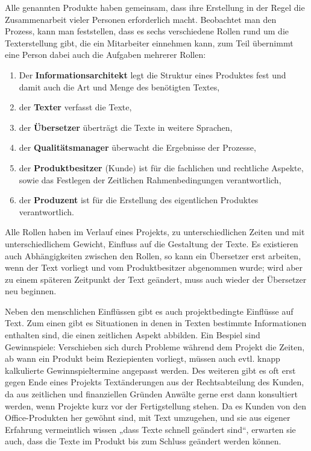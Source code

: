\documentclass[11pt,a4paper]{article}
\begin{document}
Alle genannten Produkte haben gemeinsam, dass ihre Erstellung in der Regel die Zusammenarbeit vieler Personen erforderlich macht. Beobachtet man den Prozess, kann man feststellen, dass es sechs verschiedene Rollen rund um die Texterstellung gibt, die ein Mitarbeiter einnehmen kann, zum Teil übernimmt eine Person dabei auch die Aufgaben mehrerer Rollen:
\begin{enumerate}
\addtolength{\itemsep}{-0.5\baselineskip}
\item Der \textbf{Informationsarchitekt} legt die Struktur eines Produktes fest und damit auch die Art und Menge des benötigten Textes,
\item der \textbf{Texter} verfasst die Texte,
\item der \textbf{Übersetzer} überträgt die Texte in weitere Sprachen,
\item der \textbf{Qualitätsmanager} überwacht die Ergebnisse der Prozesse,
\item der \textbf{Produktbesitzer} (Kunde) ist für die fachlichen und rechtliche Aspekte, sowie das Festlegen der Zeitlichen Rahmenbedingungen verantwortlich,
\item der \textbf{Produzent} ist für die Erstellung des eigentlichen Produktes verantwortlich.
\end{enumerate}
Alle Rollen haben im Verlauf eines Projekts, zu unterschiedlichen Zeiten und mit unterschiedlichem Gewicht, Einfluss auf die Gestaltung der Texte. Es existieren auch Abhängigkeiten zwischen den Rollen, so kann ein Übersetzer erst arbeiten, wenn der Text vorliegt und vom Produktbesitzer abgenommen wurde; wird aber zu einem späteren Zeitpunkt der Text geändert, muss auch wieder der Übersetzer neu beginnen.

Neben den menschlichen Einflüssen gibt es auch projektbedingte Einflüsse auf Text. Zum einen gibt es Situationen in denen in Texten bestimmte Informationen enthalten sind, die einen zeitlichen Aspekt abbilden. Ein Bespiel sind Gewinnspiele: Verschieben sich durch Probleme während dem Projekt die Zeiten, ab wann ein Produkt beim Reziepienten vorliegt, müssen auch evtl. knapp kalkulierte Gewinnspieltermine angepasst werden. Des weiteren gibt es oft erst gegen Ende eines Projekts Textänderungen aus der Rechtsabteilung des Kunden, da aus zeitlichen und finanziellen Gründen Anwälte gerne erst dann konsultiert werden, wenn Projekte kurz vor der Fertigstellung stehen. Da es Kunden von den Office-Produkten her gewöhnt sind, mit Text umzugehen, und sie aus eigener Erfahrung vermeintlich wissen „dass Texte schnell geändert sind“, erwarten sie auch, dass die Texte im Produkt bis zum Schluss geändert werden können.
\end{document}

